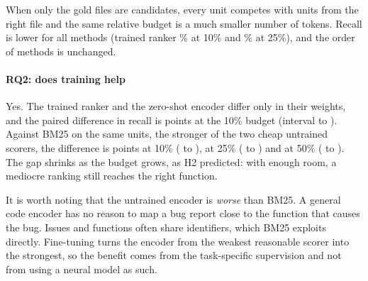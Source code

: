 When only the gold files are candidates, every unit competes with units from the right file and the same relative budget is a much smaller number of tokens. Recall is lower for all methods (trained ranker \% at 10\% and \% at 25\%), and the order of methods is unchanged.

\paragraph{RQ2: does training help} Yes. The trained ranker and the zero-shot encoder differ only in their weights, and the paired difference in recall is  points at the 10\% budget (interval  to ). Against BM25 on the same units, the stronger of the two cheap untrained scorers, the difference is  points at 10\% ( to ),  at 25\% ( to ) and  at 50\% ( to ). The gap shrinks as the budget grows, as H2 predicted: with enough room, a mediocre ranking still reaches the right function.

It is worth noting that the untrained encoder is \emph{worse} than BM25. A general code encoder has no reason to map a bug report close to the function that causes the bug. Issues and functions often share identifiers, which BM25 exploits directly. Fine-tuning turns the encoder from the weakest reasonable scorer into the strongest, so the benefit comes from the task-specific supervision and not from using a neural model as such.

